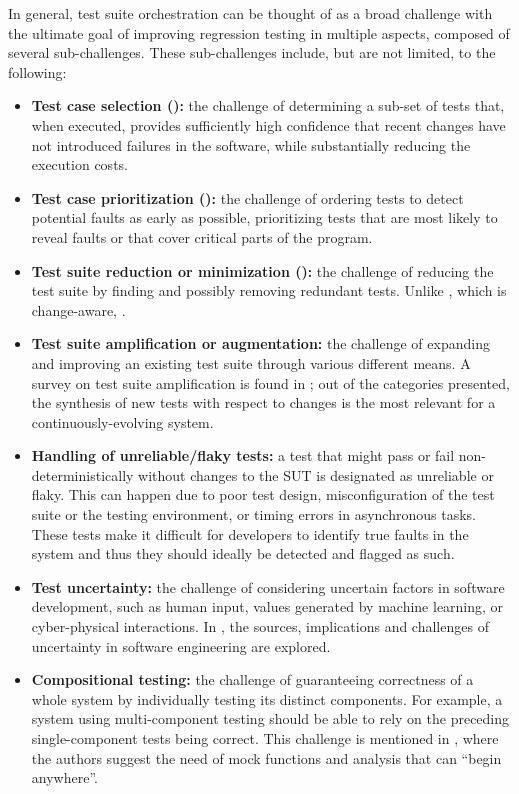 In general, test suite orchestration can be thought of as a broad challenge with the ultimate goal of improving regression testing in multiple aspects, composed of several sub-challenges.
These sub-challenges include, but are not limited, to the following:
\begin{itemize}
	\item \textbf{Test case selection (\tcs):} the challenge of determining a sub-set of tests that, when executed, provides sufficiently high confidence that recent changes have not introduced failures in the software, while substantially reducing the execution costs.
	\item \textbf{Test case prioritization (\tcp):} the challenge of ordering tests to detect potential faults as early as possible, prioritizing tests that are most likely to reveal faults or that cover critical parts of the program.
	\item \textbf{Test suite reduction or minimization (\tsr):} the challenge of reducing the test suite by finding and possibly removing redundant tests. Unlike \tcs, which is change-aware, \tsr.
	\item \textbf{Test suite amplification or augmentation:} the challenge of expanding and improving an existing test suite through various different means. A survey on test suite amplification is found in \cite{danglot_snowballing_2019}; out of the categories presented, the synthesis of new tests with respect to changes is the most relevant for a continuously-evolving system. 
	\item \textbf{Handling of unreliable/flaky tests:} a test that might pass or fail non-deterministically without changes to the SUT is designated as unreliable or flaky. This can happen due to poor test design, misconfiguration of the test suite or the testing environment, or timing errors in asynchronous tasks. These tests make it difficult for developers to identify true faults in the system and thus they should ideally be detected and flagged as such.
	\item \textbf{Test uncertainty:} the challenge of considering uncertain factors in software development, such as human input, values generated by machine learning, or cyber-physical interactions. In \cite{garlan_software_2010}, the sources, implications and challenges of uncertainty in software engineering are explored.
	\item \textbf{Compositional testing:} the challenge of guaranteeing correctness of a whole system by individually testing its distinct components. For example, a system using multi-component testing should be able to rely on the preceding single-component tests being correct. This challenge is mentioned in \cite{harman_start-ups_2018}, where the authors suggest the need of mock functions and analysis that can ``begin anywhere''.

\end{itemize}
